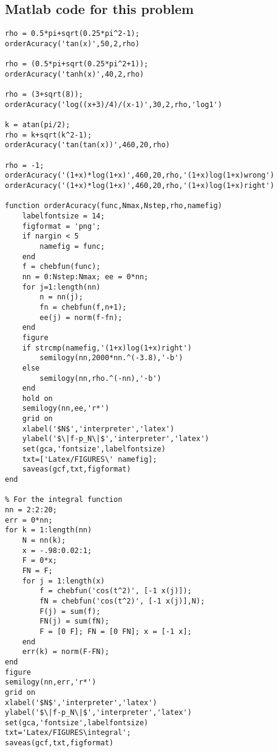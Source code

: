 \subsection*{Matlab code for this problem}
\begin{verbatim}
rho = 0.5*pi+sqrt(0.25*pi^2-1);
orderAcuracy('tan(x)',50,2,rho)

rho = (0.5*pi+sqrt(0.25*pi^2+1));
orderAcuracy('tanh(x)',40,2,rho)

rho = (3+sqrt(8));
orderAcuracy('log((x+3)/4)/(x-1)',30,2,rho,'log1')

k = atan(pi/2);
rho = k+sqrt(k^2-1);
orderAcuracy('tan(tan(x))',460,20,rho)

rho = -1;
orderAcuracy('(1+x)*log(1+x)',460,20,rho,'(1+x)log(1+x)wrong')
orderAcuracy('(1+x)*log(1+x)',460,20,rho,'(1+x)log(1+x)right')

function orderAcuracy(func,Nmax,Nstep,rho,namefig)
    labelfontsize = 14;
    figformat = 'png';
    if nargin < 5
        namefig = func;
    end
    f = chebfun(func);
    nn = 0:Nstep:Nmax; ee = 0*nn;
    for j=1:length(nn)
        n = nn(j);
        fn = chebfun(f,n+1);
        ee(j) = norm(f-fn);
    end
    figure
    if strcmp(namefig,'(1+x)log(1+x)right')
        semilogy(nn,2000*nn.^(-3.8),'-b')
    else 
        semilogy(nn,rho.^(-nn),'-b')
    end
    hold on
    semilogy(nn,ee,'r*')
    grid on
    xlabel('$N$','interpreter','latex')
    ylabel('$\|f-p_N\|$','interpreter','latex')
    set(gca,'fontsize',labelfontsize)
    txt=['Latex/FIGURES\' namefig];
    saveas(gcf,txt,figformat)
end

% For the integral function
nn = 2:2:20;
err = 0*nn;
for k = 1:length(nn)
    N = nn(k);
    x = -.98:0.02:1;
    F = 0*x;
    FN = F;
    for j = 1:length(x) 
        f = chebfun('cos(t^2)', [-1 x(j)]);
        fN = chebfun('cos(t^2)', [-1 x(j)],N);
        F(j) = sum(f);
        FN(j) = sum(fN);
        F = [0 F]; FN = [0 FN]; x = [-1 x];
    end
    err(k) = norm(F-FN);
end
figure
semilogy(nn,err,'r*')
grid on
xlabel('$N$','interpreter','latex')
ylabel('$\|f-p_N\|$','interpreter','latex')
set(gca,'fontsize',labelfontsize)
txt='Latex/FIGURES\integral';
saveas(gcf,txt,figformat)
\end{verbatim}